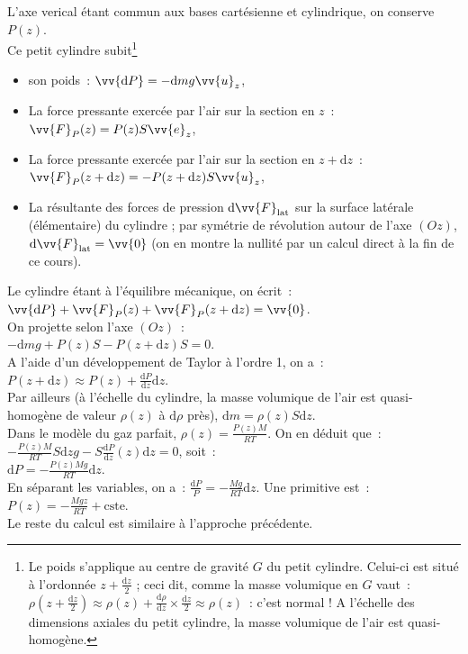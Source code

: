 \documentclass{article}
\renewcommand\overrightarrow{\vv}
\begin{document}
\begin{itemize}
L'axe verical étant commun aux bases cartésienne et cylindrique, on
conserve $P(z)$. \\
Ce petit cylindre subit\footnote{Le poids s'applique au centre de
gravité $G$ du petit cylindre. Celui-ci est situé à l'ordonnée
$z+\frac{\mathrm{d}z}{2}$ ; ceci dit, comme la masse volumique en $G$ vaut :
$\rho\left(z+\frac{\mathrm{d}z}{2}\right) \approx \rho(z)+\frac{\mathrm{d}\rho}{\mathrm{d}z}\times
\frac{\mathrm{d}z}{2} \approx \rho(z)$ : c'est normal ! A l'échelle des
dimensions axiales du petit cylindre, la masse volumique de l'air
est quasi-homogène.}
\begin{itemize}
\item son poids : $\overrightarrow{\mathrm{d}P} = -\mathrm{d}m g\overrightarrow{u}_{z}$,
\item La force pressante exercée par l'air sur la section en $z$ :
$\overrightarrow{F}_{P}(z) = P(z)S\overrightarrow{e}_{z}$,
\item La force pressante exercée par l'air sur la section en $z+\mathrm{d}z$ :
$\overrightarrow{F}_{P}(z+\mathrm{d}z) = -P(z+\mathrm{d}z)S\overrightarrow{u}_{z}$,
\item La résultante des forces de pression $\mathrm{d}\overrightarrow{F}_{\mathrm{lat}}$ sur la surface
latérale (élémentaire)  du cylindre ; par symétrie de révolution
autour de l'axe $(Oz)$,
$\mathrm{d}\overrightarrow{F}_{\mathrm{lat}}=\overrightarrow{0}$ (on en montre la
nullité par un calcul direct à la fin de ce cours).
\end{itemize}
Le cylindre étant à l'équilibre mécanique, on écrit :
$\overrightarrow{\mathrm{d}P}+\overrightarrow{F}_{P}(z)+\overrightarrow{F}_{P}(z+\mathrm{d}z)
= \overrightarrow{0}$. \\
On projette selon l'axe $(Oz)$ : \\
$-\mathrm{d}mg+P(z)S-P(z+\mathrm{d}z)S = 0$. \\
A l'aide d'un développement de Taylor à l'ordre 1, on a : $P(z+\mathrm{d}z)
\approx P(z)+\frac{\mathrm{d}P}{\mathrm{d}z}\mathrm{d}z$. \\
Par ailleurs (à l'échelle du cylindre, la masse volumique de l'air
est quasi-homogène de valeur $\rho(z)$ à $\mathrm{d}\rho$ près), $\mathrm{d}m
= \rho(z)S\mathrm{d}z$. \\
Dans le modèle du gaz parfait, $\rho(z) = \frac{P(z)M}{RT}$.
On en déduit que : \\
$-\frac{P(z)M}{RT}S\mathrm{d}zg -S\frac{\mathrm{d}P}{\mathrm{d}z}(z)\mathrm{d}z=0$, soit : \\
$\mathrm{d}P = -\frac{P(z)Mg}{RT}\mathrm{d}z$. \\
En séparant les variables, on a : $\frac{\mathrm{d}P}{P} = -
\frac{Mg}{RT}\mathrm{d}z$. Une primitive est :
$P(z) = -\frac{Mgz}{RT}+\mathrm{cste}$. \\
Le reste du calcul est similaire à l'approche précédente.
\end{itemize}
\end{document}
